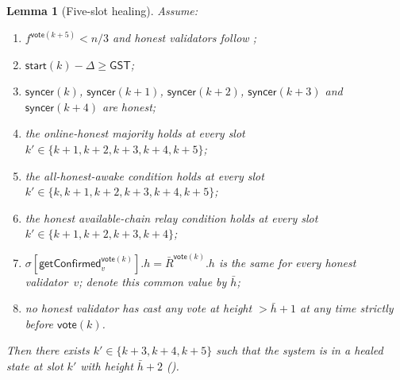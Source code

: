 \ifx\litemode\undefined\documentclass{article}\fi
\newcommand{\syncer}{\mathsf{syncer}}
\newcommand{\start}{\mathsf{start}}
\newcommand{\vote}{\mathsf{vote}}
\newcommand{\comm}[1]{\bar{#1}}
\newcommand{\getConfirmed}{\textsf{getConfirmed}\xspace}
\theoremstyle{plain}
\newtheorem{lemma}{Lemma}
\theoremstyle{definition}
\theoremstyle{remark}
\newcommand{\GST}{\ensuremath{\mathsf{GST}}}
\newcommand{\OHM}{online-honest majority\xspace}
\newcommand{\HAR}{honest available-chain relay\xspace}
\newcommand{\AHA}{all-honest-awake\xspace}
\begin{document}
\begin{lemma}[Five-slot healing]\label{rev:lem:healing-five-slot}
Assume:
\begin{enumerate}
  \item $f^{\vote(k+5)} < n/3$ and honest validators follow ;
  \item $\start(k) - \Delta \geq \GST$;
  \item $\syncer(k)$, $\syncer(k+1)$, $\syncer(k+2)$, $\syncer(k+3)$ and $\syncer(k+4)$ are honest;
  \item the \OHM holds at every slot $k' \in \{k+1, k+2, k+3, k+4, k+5\}$;
  \item the \AHA condition holds at every slot $k' \in \{k, k+1, k+2, k+3, k+4, k+5\}$;
  \item the \HAR condition holds at every slot $k' \in \{k+1, k+2, k+3, k+4\}$;
  \item $\sigma[\getConfirmed_v^{\vote(k)}].h = \comm{R}^{\vote(k)}.h$ is the same for every honest validator~$v$; denote this common value by $\comm{h}$;
  \item no honest validator has cast any vote at height $> \comm{h}+1$ at any time strictly before $\vote(k)$.
\end{enumerate}
Then there exists $k' \in \{k+3, k+4, k+5\}$ such that the system is in a healed state at slot $k'$ with height $\comm{h}+2$ ().
\end{lemma}
\end{document}
